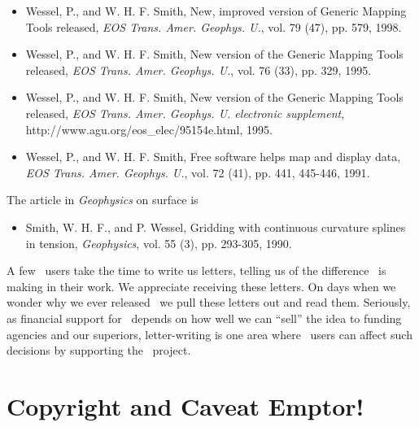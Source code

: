 \begin{itemize}

\item{Wessel, P., and W. H. F. Smith, New, improved version of Generic
Mapping Tools released, {\it EOS Trans. Amer. Geophys. U.}, vol. 79
(47), pp. 579, 1998.}

\item{Wessel, P., and W. H. F. Smith, New version of the Generic
Mapping Tools released, {\it EOS Trans. Amer. Geophys. U.}, vol. 76
(33), pp. 329, 1995.}

\item{Wessel, P., and W. H. F. Smith, New version of the Generic
Mapping Tools released, {\it EOS Trans. Amer. Geophys. U. electronic
supplement}, 
{http://www.agu.org/eos\_elec/95154e.html}, 1995.}

\item{Wessel, P., and W. H. F. Smith, Free software helps map and
display data, {\it EOS Trans. Amer. Geophys. U.}, vol. 72 (41),
pp. 441, 445-446, 1991.}

\end{itemize}

The article in {\it Geophysics} on surface is
%
%
\begin{itemize}

\item{Smith, W. H. F., and P. Wessel, Gridding with continuous
curvature splines in tension, {\it Geophysics}, vol. 55 (3), pp.
293-305, 1990.}

\end{itemize}

A few \GMT\ users take the time to write us letters, telling us of the
difference \GMT\ is making in their work.  We appreciate receiving these
letters.  On days when we wonder why we ever released \GMT\ we pull
these letters out and read them.  Seriously, as financial support for
\GMT\ depends on how well we can ``sell'' the idea to funding agencies and
our superiors, letter-writing is one area where \GMT\ users can affect
such decisions by supporting the \GMT\ project. 


\chapter*{Copyright and Caveat Emptor!}

